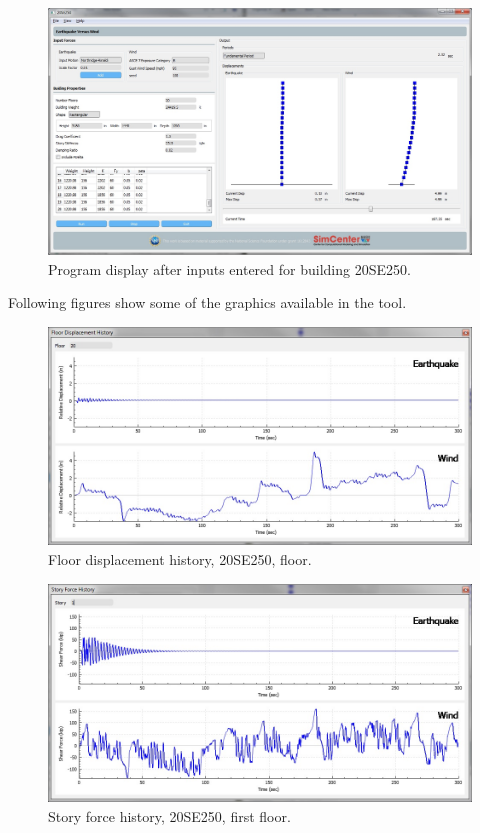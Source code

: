 \documentclass{simcenterdocumentation}
\begin{document}
\begin{figure}[H]
	\centering \includegraphics[width=0.9\linewidth]{20SE250_1.jpg}
	\caption{Program display after inputs entered for building 20SE250.}
\end{figure}
Following figures show some of the graphics available in the tool.
\begin{figure}[H]
	\centering \includegraphics[scale=0.35]{20SE250_fdh.jpg}
	\caption{Floor displacement history, 20SE250,  floor.}
\end{figure}
\begin{figure}[H]
	\centering \includegraphics[scale=0.35]{20SE250_sfh.jpg}
	\caption{Story force history, 20SE250, first floor.}
\end{figure}
\end{document}
